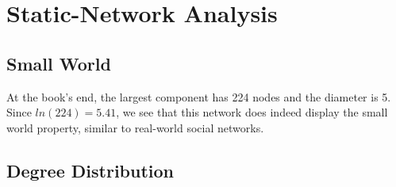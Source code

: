 \section{Static-Network Analysis}

\subsection{Small World}
At the book's end, the largest component has 224 nodes and the diameter is 5.
Since $ln(224) = 5.41$, we see that this network does indeed display the small world property, similar to real-world social networks.

\subsection{Degree Distribution}

